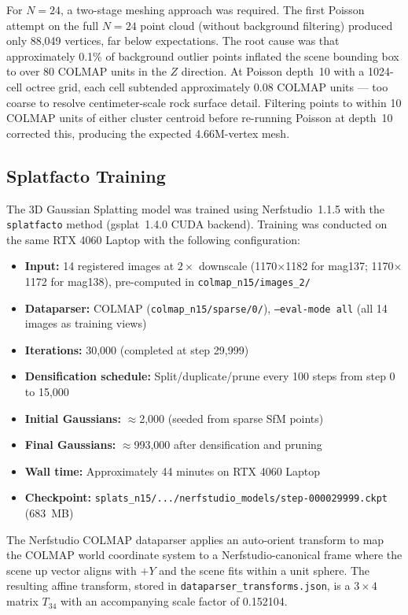 \documentclass[12pt]{article}
\begin{document}
For $N{=}24$, a two-stage meshing approach was required. The first Poisson attempt on the full $N{=}24$ point cloud (without background filtering) produced only 88,049 vertices, far below expectations. The root cause was that approximately 0.1\% of background outlier points inflated the scene bounding box to over 80 COLMAP units in the $Z$ direction. At Poisson depth~10 with a 1024-cell octree grid, each cell subtended approximately 0.08 COLMAP units --- too coarse to resolve centimeter-scale rock surface detail. Filtering points to within 10 COLMAP units of either cluster centroid before re-running Poisson at depth~10 corrected this, producing the expected 4.66M-vertex mesh.

\subsection{Splatfacto Training}

The 3D Gaussian Splatting model was trained using Nerfstudio~1.1.5 with the \texttt{splatfacto} method (gsplat~1.4.0 CUDA backend). Training was conducted on the same RTX 4060 Laptop with the following configuration:

\begin{itemize}
    \item \textbf{Input:} 14 registered images at $2\times$ downscale (1170$\times$1182 for mag137; 1170$\times$1172 for mag138), pre-computed in \texttt{colmap\_n15/images\_2/}
    \item \textbf{Dataparser:} COLMAP (\texttt{colmap\_n15/sparse/0/}), \texttt{--eval-mode all} (all 14 images as training views)
    \item \textbf{Iterations:} 30,000 (completed at step 29,999)
    \item \textbf{Densification schedule:} Split/duplicate/prune every 100 steps from step 0 to 15,000
    \item \textbf{Initial Gaussians:} $\approx$2,000 (seeded from sparse SfM points)
    \item \textbf{Final Gaussians:} $\approx$993,000 after densification and pruning
    \item \textbf{Wall time:} Approximately 44 minutes on RTX 4060 Laptop
    \item \textbf{Checkpoint:} \texttt{splats\_n15/.../nerfstudio\_models/step-000029999.ckpt} (683~MB)
\end{itemize}

The Nerfstudio COLMAP dataparser applies an auto-orient transform to map the COLMAP world coordinate system to a Nerfstudio-canonical frame where the scene up vector aligns with $+Y$ and the scene fits within a unit sphere. The resulting affine transform, stored in \texttt{dataparser\_transforms.json}, is a $3 \times 4$ matrix $T_{34}$ with an accompanying scale factor of 0.152104.
\end{document}
